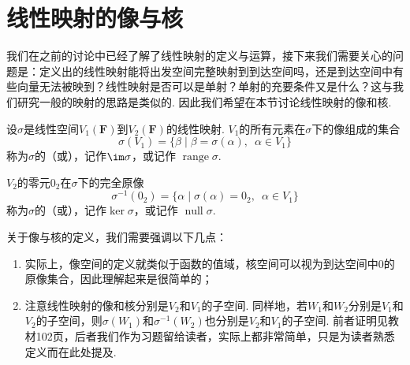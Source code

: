 \section{线性映射的像与核}

我们在之前的讨论中已经了解了线性映射的定义与运算，接下来我们需要关心的问题是：定义出的线性映射能将出发空间完整映射到到达空间吗，还是到达空间中有些向量无法被映到？线性映射是否可以是单射？单射的充要条件又是什么？这与我们研究一般的映射的思路是类似的. 因此我们希望在本节讨论线性映射的像和核.
\begin{definition}
    设$\sigma$是线性空间$V_1(\mathbf{F})$到$V_2(\mathbf{F})$的线性映射. $V_1$的所有元素在$\sigma$下的像组成的集合
    \[\sigma(V_1)=\{\beta \mid \beta=\sigma(\alpha),\enspace \alpha \in V_1\}\]
    称为$\sigma$的（或），记作$\im \sigma$，或记作 $\operatorname{range}\sigma$.

    $V_2$的零元$0_2$在$\sigma$下的完全原像
    \[\sigma^{-1}(0_2)=\{\alpha \mid \sigma(\alpha)=0_2,\enspace \alpha \in V_1\}\]
    称为$\sigma$的（或），记作$\ker \sigma$，或记作 $\operatorname{null}\sigma$.
\end{definition}

关于像与核的定义，我们需要强调以下几点：
\begin{enumerate}
    \item 实际上，像空间的定义就类似于函数的值域，核空间可以视为到达空间中0的原像集合，因此理解起来是很简单的；

    \item 注意线性映射的像和核分别是$V_2$和$V_1$的子空间. 同样地，若$W_1$和$W_2$分别是$V_1$和$V_2$的子空间，则$\sigma(W_1)$和$\sigma^{-1}(W_2)$也分别是$V_2$和$V_1$的子空间. 前者证明见教材102页，后者我们作为习题留给读者，实际上都非常简单，只是为读者熟悉定义而在此处提及.
\end{enumerate}

